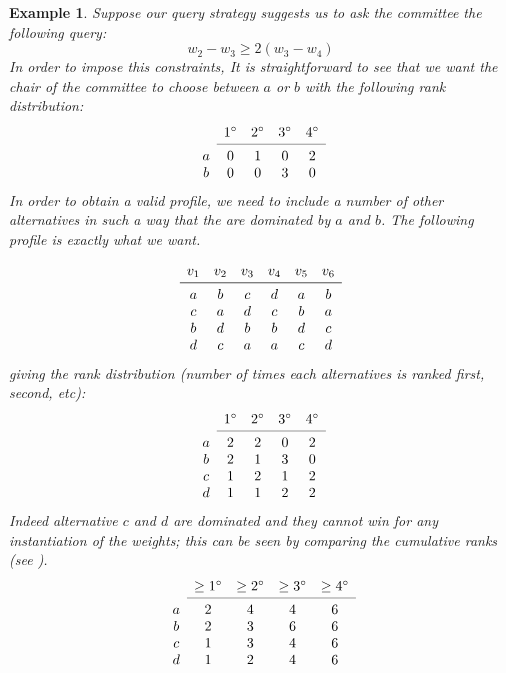 \documentclass[12pt]{article}
\newtheorem{example}{Example}
\begin{document}
\begin{example}
Suppose our query strategy suggests us to ask the committee the following query:
\[ w_{2} - w_{3} \geq 2(w_{3} - w_{4}) \]
In order to impose this constraints,
It is straightforward to see that we want the  chair of the committee to choose between $a$ or $b$ with the following rank distribution:
\[
\begin{array}{ccccc}
& 1^\circ
& 2^\circ
& 3^\circ
& 4^\circ \\
\cmidrule{2-5}
a & 0& 1& 0& 2 \\
b& 0& 0& 3& 0 \\
\end{array}
\]
In order to obtain a valid profile, we need to include a number of other alternatives in such a way that the are dominated by $a$ and $b$.
The following profile is exactly what we want.

\[
\begin{array}{cccccc}
v_1& v_2& v_3 & v_4& v_5& v_6 \\
\midrule 
a& b& c & d& a& b \\
c& a& d& c& b& a \\
b& d& b& b& d& c \\
d& c& a& a& c& d \\
\end{array}
\]
giving the rank distribution (number of times each alternatives is ranked first, second, etc): 
\[
\begin{array}{ccccc}
& 1^\circ& 2^\circ& 3^\circ& 4^\circ \\
\cmidrule{2-5}
a & 2& 2& 0& 2 \\
b& 2& 1& 3& 0 \\
c& 1& 2& 1& 2 \\
d& 1& 1& 2& 2 \\
\end{array}
\]
Indeed alternative $c$ and $d$ are dominated and they cannot win for any instantiation of the weights; this can be seen by comparing the cumulative ranks (see  \cite{Stein1994}).
\[
\begin{array}{ccccc}
& \geq 1^\circ
& \geq 2^\circ
& \geq 3^\circ
& \geq 4^\circ \\
\cmidrule{2-5}
a & 2 & 4& 4& 6 \\
b & 2 & 3& 6& 6 \\
c& 1& 3& 4& 6 \\
d& 1& 2& 4& 6 \\
\end{array}
\]
\end{example}
\end{document}
